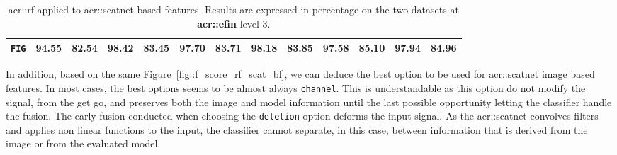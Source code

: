 \begin{sidewaystable}[htpb]
\begin{tabular}{| c | c c | c c | c c | c c | c c | c c |}
                    \hline
                    \texttt{FIG} & 94.55 & 82.54 & 98.42 & 83.45 & 97.70 & 83.71 & 98.18 & 83.85 & 97.58 & 85.10 & \textbf{97.94} & \textbf{84.96} \\
                    \hline
                \end{tabular}
                \caption{
                    \label{tab::stats_scat_rf_f3}
                    \gls{acr::rf} applied to \gls{acr::scatnet} based features.
                    Results are expressed in percentage on the two datasets at \textbf{\gls{acr::efin}} level 3.
                }
            \end{sidewaystable}
            
            In addition, based on the same Figure~\ref{fig::f_score_rf_scat_bl}, we can deduce the best option to be used for \gls{acr::scatnet} image based features.
            In most cases, the best options seems to be almost always \texttt{channel}.
            This is understandable as this option do not modify the signal, from the get go, and preserves both the image and model information until the last possible opportunity letting the classifier handle the fusion.
            The early fusion conducted when choosing the \texttt{deletion} option deforms the input signal.
            As the \gls{acr::scatnet} convolves filters and applies non linear functions to the input, the classifier cannot separate, in this case, between information that is derived from the image or from the evaluated model.\\

